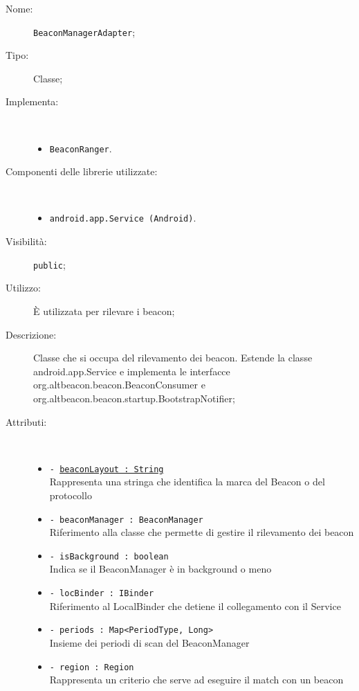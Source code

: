 \documentclass[../DefinizioneDiProdotto.tex]{subfiles}
\begin{document}
\begin{description}
	\item[Nome:] \texttt{BeaconManagerAdapter};
	\item[Tipo:] Classe;
	\item[Implementa:] \
	\begin{itemize}
		\item \texttt{BeaconRanger}.
		
	\end{itemize}
	\item[Componenti delle librerie utilizzate:] \
	\begin{itemize}
		\item \texttt{android.app.Service (Android)}.
		
	\end{itemize}
	\item[Visibilità:] \texttt{public};
	\item[Utilizzo:] È utilizzata per rilevare i beacon;
	\item[Descrizione:] Classe che si occupa del rilevamento dei beacon. Estende la classe android.app.Service e implementa le interfacce org.altbeacon.beacon.BeaconConsumer e org.altbeacon.beacon.startup.BootstrapNotifier;
	\item[Attributi:] \
	\begin{itemize}
		\item \texttt{- \underline{beaconLayout : String}}\\
		Rappresenta una stringa che identifica la marca del Beacon o del protocollo
		
		\item \texttt{- beaconManager : BeaconManager}\\
		Riferimento alla classe che permette di gestire il rilevamento dei beacon
		
		\item \texttt{- isBackground : boolean}\\
		Indica se il BeaconManager è in background o meno
		
		\item \texttt{- locBinder : IBinder}\\
		Riferimento al LocalBinder che detiene il collegamento con il Service
		
		\item \texttt{- periods : Map<PeriodType, Long>}\\
		Insieme dei periodi di scan del BeaconManager
		
		\item \texttt{- region : Region}\\
		Rappresenta un criterio che serve ad eseguire il match con un beacon
		

\end{itemize}
\end{description}
\end{document}
